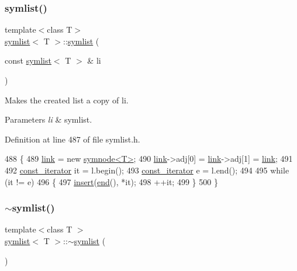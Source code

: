 \subsubsection{\texorpdfstring{symlist()}{symlist()}\hspace{0.1cm}{\footnotesize\ttfamily [2/2]}}
{\footnotesize\ttfamily template$<$class T$>$ \\
\mbox{\hyperlink{classsymlist}{symlist}}$<$ T $>$\+::\mbox{\hyperlink{classsymlist}{symlist}} (\begin{DoxyParamCaption}\item[{const \mbox{\hyperlink{classsymlist}{symlist}}$<$ T $>$ \&}]{li }\end{DoxyParamCaption})}



Makes the created list a copy of {\ttfamily li}. 


\begin{DoxyParams}{Parameters}
{\em li} & symlist. \\
\hline
\end{DoxyParams}


Definition at line 487 of file symlist.\+h.


\begin{DoxyCode}
488 \{
489     \mbox{\hyperlink{classsymlist_a8fa81a7f6d0bb986bb593776db582c90}{link}} = \textcolor{keyword}{new} \mbox{\hyperlink{structsymnode}{symnode<T>}};
490     \mbox{\hyperlink{classsymlist_a8fa81a7f6d0bb986bb593776db582c90}{link}}->adj[0] = \mbox{\hyperlink{classsymlist_a8fa81a7f6d0bb986bb593776db582c90}{link}}->adj[1] = \mbox{\hyperlink{classsymlist_a8fa81a7f6d0bb986bb593776db582c90}{link}};    
491     
492     \mbox{\hyperlink{classsymlist_af15c0ca931299054f83d17a1580a5159}{const\_iterator}} it = l.begin();
493     \mbox{\hyperlink{classsymlist_af15c0ca931299054f83d17a1580a5159}{const\_iterator}} e = l.end();
494 
495     \textcolor{keywordflow}{while} (it != e)
496     \{
497     \mbox{\hyperlink{classsymlist_a8b3327b8a33b180bf1eb802856f755c3}{insert}}(\mbox{\hyperlink{classsymlist_a7283589fa01f79d722f8256d7a6a7883}{end}}(), *it);
498     ++it;
499     \}
500 \}
\end{DoxyCode}
\mbox{\label{classsymlist_a45c3a0b7f0e996998037fb876effefd4}} 
\subsubsection{\texorpdfstring{$\sim$symlist()}{~symlist()}}
{\footnotesize\ttfamily template$<$class T $>$ \\
\mbox{\hyperlink{classsymlist}{symlist}}$<$ T $>$\+::$\sim$\mbox{\hyperlink{classsymlist}{symlist}} (\begin{DoxyParamCaption}{ }\end{DoxyParamCaption})}



